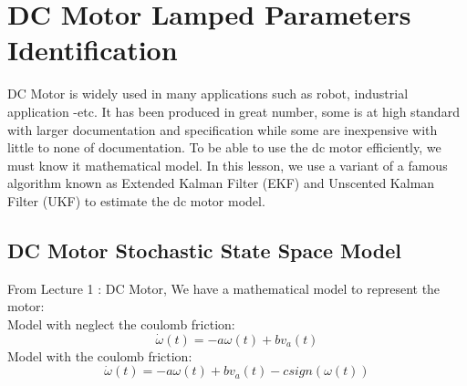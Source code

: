 \chapter{DC Motor Lamped Parameters Identification}
DC Motor is widely used in many applications such as robot, industrial application -etc. It has been produced in great number, some is at high standard with larger documentation and specification while some are inexpensive with little to none of documentation. To be able to use the dc motor efficiently, we must know it mathematical model. In this lesson, we use a variant of a famous algorithm known as Extended Kalman Filter (EKF) and Unscented Kalman Filter (UKF) to estimate the dc motor model.\par

\section{DC Motor Stochastic State Space Model}
	From Lecture 1 : DC Motor, We have a mathematical model to represent the motor:\\
	Model with neglect the coulomb friction:
	\[\boxed{\dot{\omega}(t) = - a\omega(t) + bv_a(t)}\]
	Model with the coulomb friction:
	\[\boxed{\dot{\omega}(t) = - a\omega(t) + bv_a(t) - csign(\omega(t))}\]

